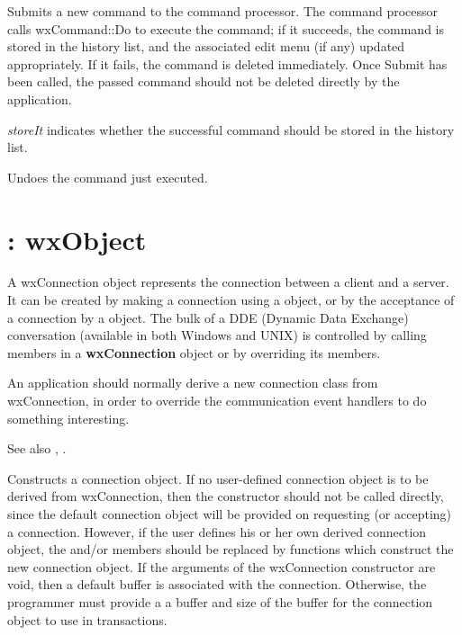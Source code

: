 
Submits a new command to the command processor. The command processor
calls wxCommand::Do to execute the command; if it succeeds, the command
is stored in the history list, and the associated edit menu (if any) updated
appropriately. If it fails, the command is deleted
immediately. Once Submit has been called, the passed command should not
be deleted directly by the application.

{\it storeIt} indicates whether the successful command should be stored
in the history list.



Undoes the command just executed.






\section{: wxObject}\label{wxconnection}


A wxConnection object represents the connection between a client and a
server. It can be created by making a connection using a\rtfsp
{} object, or by the acceptance of a connection by a\rtfsp
{} object. The bulk of a DDE (Dynamic Data Exchange)
conversation (available in both Windows and UNIX) is controlled by
calling members in a {\bf wxConnection} object or by overriding its
members.

An application should normally derive a new connection class from
wxConnection, in order to override the communication event handlers
to do something interesting.

See also , .




Constructs a connection object. If no user-defined connection object is
to be derived from wxConnection, then the constructor should not be
called directly, since the default connection object will be provided on
requesting (or accepting) a connection. However, if the user defines his
or her own derived connection object, the \rtfsp
and/or  members should be replaced by
functions which construct the new connection object. If the arguments of
the wxConnection constructor are void, then a default buffer is
associated with the connection. Otherwise, the programmer must provide a
a buffer and size of the buffer for the connection object to use in
transactions.


